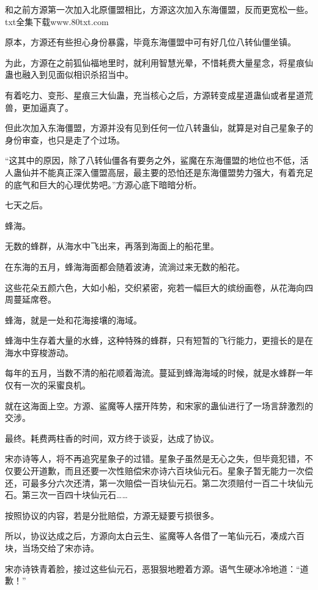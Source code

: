 
\begin{this_body}

和之前方源第一次加入北原僵盟相比，方源这次加入东海僵盟，反而更宽松一些。txt全集下载www.80txt.com

原本，方源还有些担心身份暴露，毕竟东海僵盟中可有好几位八转仙僵坐镇。

为此，方源在之前狐仙福地里时，就利用智慧光晕，不惜耗费大量星念，将星痕仙蛊也融入到见面似相识杀招当中。

有着吃力、变形、星痕三大仙蛊，充当核心之后，方源转变成星道蛊仙或者星道荒兽，更加逼真了。

但此次加入东海僵盟，方源并没有见到任何一位八转蛊仙，就算是对自己星象子的身份审查，也只是走了个过场。

“这其中的原因，除了八转仙僵各有要务之外，鲨魔在东海僵盟的地位也不低，活人蛊仙并不能真正深入僵盟高层，最主要的恐怕还是东海僵盟势力强大，有着充足的底气和巨大的心理优势吧。”方源心底下暗暗分析。

七天之后。

蜂海。

无数的蜂群，从海水中飞出来，再落到海面上的船花里。

在东海的五月，蜂海海面都会随着波涛，流淌过来无数的船花。

这些花朵五颜六色，大如小船，交织紧密，宛若一幅巨大的缤纷画卷，从花海向四周蔓延席卷。

蜂海，就是一处和花海接壤的海域。

蜂海中生存着大量的水蜂，这种特殊的蜂群，只有短暂的飞行能力，更擅长的是在海水中穿梭游动。

每年的五月，当数不清的船花顺着海流。蔓延到蜂海海域的时候，就是水蜂群一年仅有一次的采蜜良机。

就在这海面上空。方源、鲨魔等人摆开阵势，和宋家的蛊仙进行了一场言辞激烈的交涉。

最终。耗费两柱香的时间，双方终于谈妥，达成了协议。

宋亦诗等人，将不再追究星象子的过错。星象子虽然是无心之失，但毕竟犯错，不仅要公开道歉，而且还要一次性赔偿宋亦诗六百块仙元石。星象子暂无能力一次偿还，可最多分六次还清，第一次赔偿一百块仙元石。第二次须赔付一百二十块仙元石。第三次一百四十块仙元石……

按照协议的内容，若是分批赔偿，方源无疑要亏损很多。

所以，协议达成之后，方源向太白云生、鲨魔等人各借了一笔仙元石，凑成六百块，当场交给了宋亦诗。

宋亦诗铁青着脸，接过这些仙元石，恶狠狠地瞪着方源。语气生硬冰冷地道：“道歉！”


\end{this_body}
